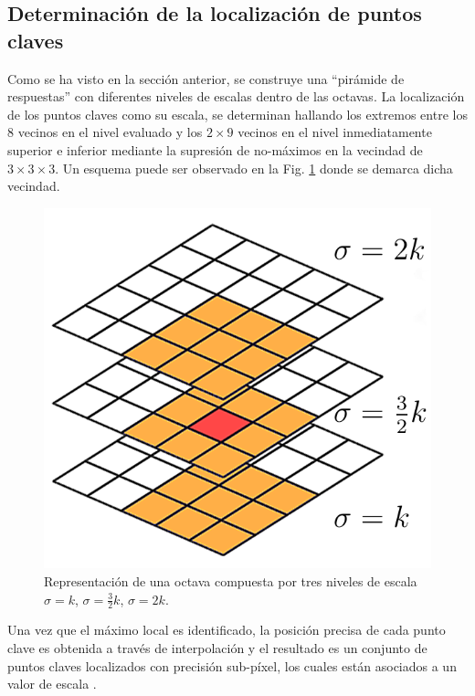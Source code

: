       \subsection{Determinación de la localización de puntos claves} %
    Como se ha visto en la sección anterior, se construye una ``pirámide de respuestas'' con diferentes niveles de escalas dentro de las octavas. La localización de los puntos claves como su escala, se determinan hallando los extremos entre los 8 vecinos en el nivel evaluado y los $2 \times 9$ vecinos en el nivel inmediatamente superior e inferior mediante la supresión de no-máximos en la vecindad de $3 \times 3 \times 3$. Un esquema puede ser observado en la Fig. \ref{fig:maximum_supression3by3by3} donde se demarca dicha vecindad.
      \begin{figure}[tbhp]
	\centering
	      \includegraphics[scale=0.35]{./figs/333nonmaximum}
	  \caption[Representación de una octava compuesta por tres niveles de escala]{Representación de una octava compuesta por tres niveles de escala $\sigma=k$, $\sigma=\frac{3}{2}k$, $\sigma=2k$.}
	\label{fig:maximum_supression3by3by3}               %
      \end{figure}

      	Una vez que el máximo local es identificado, la posición precisa de cada punto clave es obtenida a través de interpolación y el resultado es un conjunto de puntos claves localizados con precisión sub-píxel, los cuales están asociados a un valor de escala \cite{DBLP:phd/ch/Bay2009}.
      	
